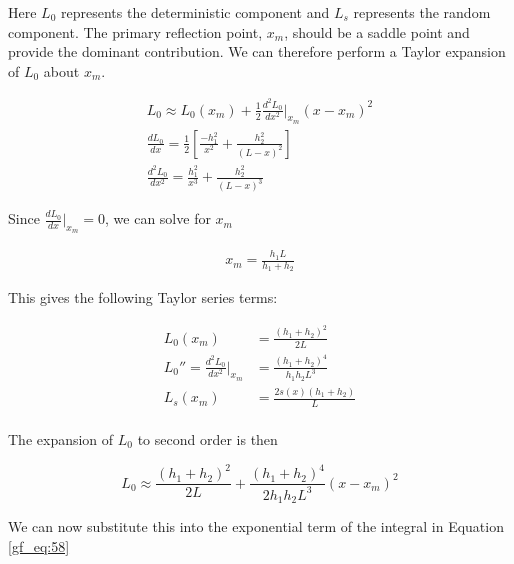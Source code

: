 Here $L_0$ represents the deterministic component and $L_s$ represents the random component. The primary reflection point, $x_m$, should be a saddle point and provide the dominant contribution. We can therefore perform a Taylor expansion of $L_0$ about $x_m$.

\begin{equation}
\begin{gathered}
\label{gf_eq:61}
L_0 \approx L_0(x_m) + \frac{1}{2}\frac{d^2L_0}{dx^2}\bigg|_{x_m}(x-x_m)^2 \\
\frac{dL_0}{dx} = \frac{1}{2}\left[\frac{-h_1^2}{x^2} + \frac{h_2^2}{(L-x)^2} \right]\\
\frac{d^2L_0}{dx^2} = \frac{h_1^2}{x^3} + \frac{h_2^2}{(L-x)^3} 
\end{gathered}
\end{equation}
\renewcommand{\baselinestretch}{2} \small\normalsize

\noindent Since $\frac{dL_0}{dx}\big|_{x_m} = 0$, we can solve for $x_m$

\begin{equation}
\begin{gathered}
x_m = \frac{h_1L}{h_1+h_2}
\end{gathered}
\label{gf_eq:64}
\end{equation}
\renewcommand{\baselinestretch}{2} \small\normalsize

\noindent This gives the following Taylor series terms:

\begin{equation}
\begin{aligned}
L_0(x_m) &= \frac{(h_1+h_2)^2}{2L} \\
L_0''=\frac{d^2L_0}{dx^2}\bigg|_{x_m}  &= \frac{(h_1+h_2)^4}{h_1h_2L^3} \\
L_s(x_m) &= \frac{2s(x)(h_1 + h_2)}{L}\\
\end{aligned}
\label{gf_eq:65}
\end{equation}
\renewcommand{\baselinestretch}{2} \small\normalsize

\noindent The expansion of $L_0$ to second order is then

\begin{equation}
L_0 \approx \frac{(h_1+h_2)^2}{2L} + \frac{(h_1+h_2)^4}{2h_1h_2L^3}(x-x_m)^2
\label{gf_eq:66}
\end{equation}
\renewcommand{\baselinestretch}{2} \small\normalsize

\noindent We can now substitute this into the exponential term of the integral in Equation \ref{gf_eq:58}

